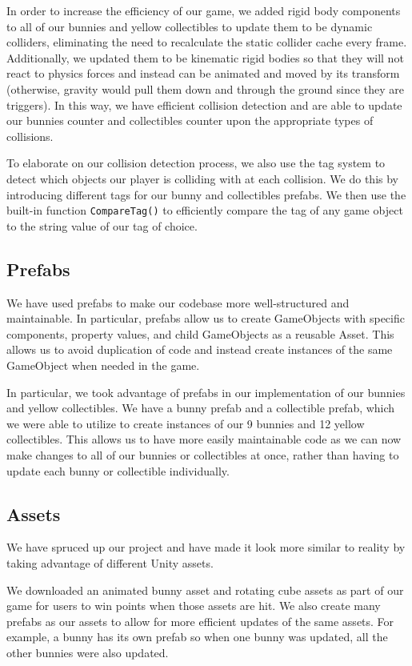 \documentclass[12pt]{article}
\begin{document}
  In order to increase the efficiency of our game, we added rigid body components to all of our bunnies and yellow collectibles to update them to be dynamic colliders, eliminating the need to recalculate the static collider cache every frame. Additionally, we updated them to be kinematic rigid bodies so that they will not react to physics forces and instead can be animated and moved by its transform (otherwise, gravity would pull them down and through the ground since they are triggers). 
  In this way, we have efficient collision detection and are able to update our bunnies counter and collectibles counter upon the appropriate types of collisions. 

  To elaborate on our collision detection process, we also use the tag system to detect which objects our player is colliding with at each collision. We do this by introducing different tags for our bunny and collectibles prefabs. We then use the built-in function \verb+CompareTag()+ to efficiently compare the tag of any game object to the string value of our tag of choice. 

\subsection{Prefabs}
  We have used prefabs to make our codebase more well-structured and maintainable.
  In particular, prefabs allow us to create GameObjects with specific components, property values, and child GameObjects as a reusable Asset. This allows us to avoid duplication of code and instead create instances of the same GameObject when needed in the game. 

  In particular, we took advantage of prefabs in our implementation of our bunnies and yellow collectibles. We have a bunny prefab and a collectible prefab, which we were able to utilize to create instances of our 9 bunnies and 12 yellow collectibles. This allows us to have more easily maintainable code as we can now make changes to all of our bunnies or collectibles at once, rather than having to update each bunny or collectible individually.


\subsection{Assets}
  We have spruced up our project and have made it look more similar to reality by taking advantage of different Unity assets.
  
  We downloaded an animated bunny asset and rotating cube assets as part of our game for users to win points when those assets are hit. We also create many prefabs as our assets to allow for more efficient updates of the same assets. For example, a bunny has its own prefab so when one bunny was updated, all the other bunnies were also updated. 
 
\end{document}

